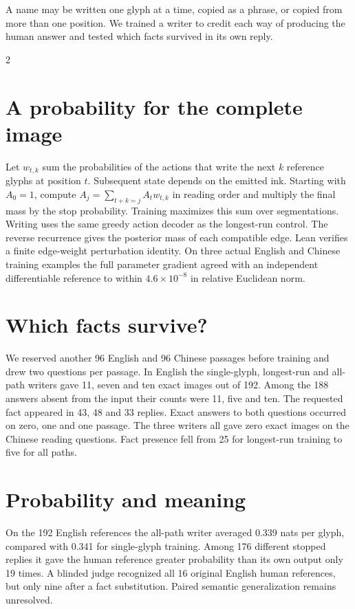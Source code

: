 \noindent A name may be written one glyph at a time, copied as a phrase, or copied from more than one position. We trained a writer to credit each way of producing the human answer and tested which facts survived in its own reply.
\begin{multicols}{2}
\section*{A probability for the complete image}
Let $w_{t,k}$ sum the probabilities of the actions that write the next $k$ reference glyphs at position $t$. Subsequent state depends on the emitted ink. Starting with $A_0=1$, compute $A_j=\sum_{t+k=j}A_t w_{t,k}$ in reading order and multiply the final mass by the stop probability. Training maximizes this sum over segmentations. Writing uses the same greedy action decoder as the longest-run control. The reverse recurrence gives the posterior mass of each compatible edge. Lean verifies a finite edge-weight perturbation identity. On three actual English and Chinese training examples the full parameter gradient agreed with an independent differentiable reference to within $4.6\times10^{-8}$ in relative Euclidean norm.
\section*{Which facts survive?}
We reserved another 96 English and 96 Chinese passages before training and drew two questions per passage. In English the single-glyph, longest-run and all-path writers gave 11, seven and ten exact images out of 192. Among the 188 answers absent from the input their counts were 11, five and ten. The requested fact appeared in 43, 48 and 33 replies. Exact answers to both questions occurred on zero, one and one passage. The three writers all gave zero exact images on the Chinese reading questions. Fact presence fell from 25 for longest-run training to five for all paths.
\section*{Probability and meaning}
On the 192 English references the all-path writer averaged 0.339 nats per glyph, compared with 0.341 for single-glyph training. Among 176 different stopped replies it gave the human reference greater probability than its own output only 19 times. A blinded judge recognized all 16 original English human references, but only nine after a fact substitution. Paired semantic generalization remains unresolved.
\end{multicols}
